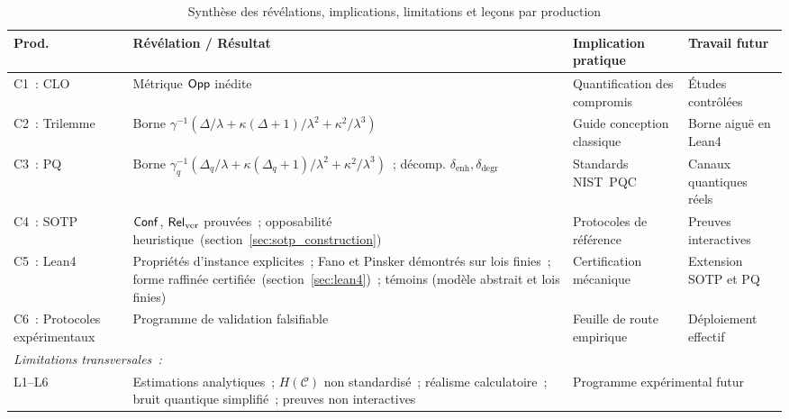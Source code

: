 \begin{table}[H]
\centering
\caption{Synth\`ese des r\'ev\'elations, implications, limitations et
le\c{c}ons par production}
\label{tab:synthese_discussions}
\begin{tabular}{@{}p{1.8cm}p{3cm}p{3cm}p{3.5cm}@{}}
\toprule
\textbf{Prod.} & \textbf{R\'ev\'elation / R\'esultat}
  & \textbf{Implication pratique} & \textbf{Travail futur} \\
\midrule
C1~: CLO & M\'etrique $\mathsf{Opp}$ in\'edite~\cite{MINKA2026CLO}
  & Quantification des compromis
  & \'Etudes contr\^ol\'ees \\
C2~: Trilemme & Borne $\gamma^{-1}(\Delta/\lambda + \kappa(\Delta+1)/\lambda^2 + \kappa^2/\lambda^3)$~\cite{MINKA2026CRO}
    & Guide conception classique
  & Borne aigu\"e en Lean4 \\
C3~: PQ & Borne $\gamma_q^{-1}(\Delta_q/\lambda + \kappa(\Delta_q+1)/\lambda^2 + \kappa^2/\lambda^3)$~\cite{MINKA2026PQCRO};
  d\'ecomp. $\delta_{\text{enh}},\delta_{\text{degr}}$
  & Standards NIST~PQC
  & Canaux quantiques r\'eels \\
C4~: SOTP & $\mathsf{Conf}$, $\mathsf{Rel}_{\mathrm{ver}}$ prouv\'ees~; opposabilit\'e heuristique~(section~\ref{sec:sotp_construction})
  & Protocoles de r\'ef\'erence
  & Preuves interactives \\
C5~: Lean4 & Propri\'et\'es d'instance explicites~;
  Fano et Pinsker d\'emontr\'es sur lois finies~;
  forme raffin\'ee certifi\'ee~(section~\ref{sec:lean4})~;
  t\'emoins (mod\`ele abstrait et lois finies)
  & Certification m\'ecanique
  & Extension SOTP et PQ \\
C6~: Protocoles exp\'erimentaux & Programme de validation falsifiable
  & Feuille de route empirique
  & D\'eploiement effectif \\
\midrule
\multicolumn{4}{l}{\textit{Limitations transversales~:}} \\
L1--L6 & Estimations analytiques~; $H(\mathcal{C})$ non standardis\'e~;
  r\'ealisme calculatoire~; bruit quantique simplifi\'e~;
  preuves non interactives
  & \multicolumn{2}{l}{Programme exp\'erimental
    futur} \\
\bottomrule
\end{tabular}
\end{table}